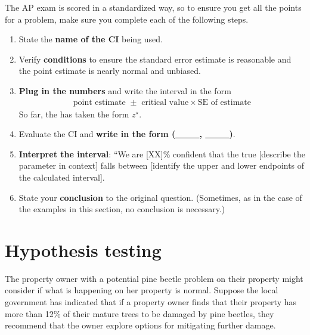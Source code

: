 \begin{termBox}{
The AP exam is scored in a standardized way, so to ensure you get all the points for a problem, make sure you complete each of the following steps.
\begin{enumerate}
\setlength{\itemsep}{0mm}
\item State the \textbf{name of the CI} being used.
\item Verify \textbf{conditions} to ensure the standard error estimate is reasonable and the point estimate is nearly normal and unbiased.
\item \textbf{Plug in the numbers} and write the interval in the form\vspace{-1mm}
\begin{align*}
\text{point estimate } \pm \text{ critical value}\times \text{SE of estimate}
\end{align*}\vspace{-1mm}%
So far, the  has taken the form $z^\star$.
\item Evaluate the CI and \textbf{write in the form (\underline{\ \ \ \ \ }, \underline{\ \ \ \ \ })}.
\item \textbf{Interpret the interval}:  ``We are [XX]\% confident that the true [describe the parameter in context] falls between [identify the upper and lower endpoints of the calculated interval].
\item State your \textbf{conclusion} to the original question. (Sometimes, as in the case of the examples in this section, no conclusion is necessary.)
\end{enumerate}}
\end{termBox}



\section{Hypothesis testing}
\label{hypothesisTesting}


The property owner with a potential pine beetle problem on their property might consider if what is happening on her property is normal. Suppose the local government has indicated that if a property owner finds that their property has more than 12\% of their mature trees to be damaged by pine beetles, they recommend that the owner explore options for mitigating further damage.

